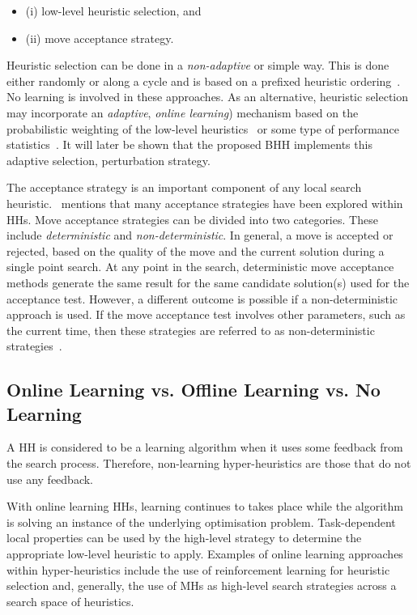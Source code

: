 \begin{itemize}
      \item (i) low-level heuristic selection, and
      \item (ii) move acceptance strategy.
\end{itemize}

Heuristic selection can be done in a \textit{non-adaptive} or simple way. This is done either randomly or along a cycle and is based on a prefixed heuristic ordering~\cite{ref:cowling:2000}. No learning is involved in these approaches. As an alternative, heuristic selection may incorporate an \textit{adaptive}, \textit{online learning}) mechanism based on the probabilistic weighting of the low-level heuristics~\cite{ref:burke:2003} or some type of performance statistics~\cite{ref:cowling:2000}. It will later be shown that the proposed \ac{BHH} implements this adaptive selection, perturbation strategy.

The acceptance strategy is an important component of any local search heuristic.~\cite{ref:burke:2003} mentions that many acceptance strategies have been explored within \acp{HH}. Move acceptance strategies can be divided into two categories. These include \textit{deterministic} and \textit{non-deterministic}. In general, a move is accepted or rejected, based on the quality of the move and the current solution during a single point search. At any point in the search, deterministic move acceptance methods generate the same result for the same candidate solution(s) used for the acceptance test. However, a different outcome is possible if a non-deterministic approach is used. If the move acceptance test involves other parameters, such as the current time, then these strategies are referred to as non-deterministic strategies~\cite{ref:burke:2003}.

\subsection{Online Learning vs. Offline Learning vs. No Learning}

A \ac{HH} is considered to be a learning algorithm when it uses some feedback from the search process. Therefore, non-learning hyper-heuristics are those that do not use any feedback.

With online learning \acp{HH}, learning continues to takes place while the algorithm is solving an instance of the underlying optimisation problem. Task-dependent local properties can be used by the high-level strategy to determine the appropriate low-level heuristic to apply. Examples of online learning approaches within hyper-heuristics include the use of reinforcement learning for heuristic selection and, generally, the use of \acp{MH} as high-level search strategies across a search space of heuristics.

